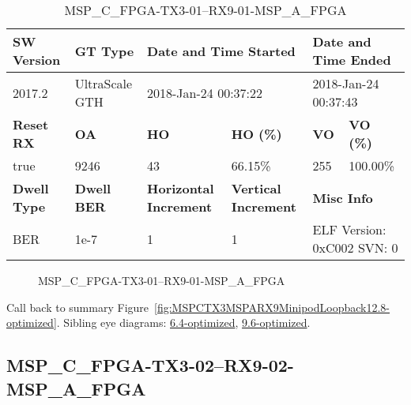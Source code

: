 \begin{table}[h]
\centering
\caption{MSP\_C\_FPGA-TX3-01--RX9-01-MSP\_A\_FPGA}
\label{tab:MSPCFPGATX301RX901MSPAFPGA12.8-optimized}
\begin{tabular}{@{}|l|l|l|l|l|l|@{}}
\toprule
\textbf{SW Version}                & \textbf{GT Type}   & \multicolumn{2}{l|}{\textbf{Date and Time Started}}            & \multicolumn{2}{l|}{\textbf{Date and Time Ended}}        \\ \midrule
2017.2                       & UltraScale GTH          & \multicolumn{2}{l|}{2018-Jan-24 00:37:22}                   & \multicolumn{2}{l|}{2018-Jan-24 00:37:43}               \\ \midrule
\textbf{Reset RX}                  & \textbf{OA} & \textbf{HO}   & \textbf{HO (\%)} & \textbf{VO} & \textbf{VO (\%)} \\ \midrule
true & 9246        & 43          & 66.15\%        & 255        & 100.00\%       \\ \midrule
\textbf{Dwell Type}                & \textbf{Dwell BER} & \textbf{Horizontal Increment} & \textbf{Vertical Increment}    & \multicolumn{2}{l|}{\textbf{Misc Info}}                  \\ \midrule
BER                            & 1e-7        & 1        & 1           & \multicolumn{2}{l|}{ELF Version: 0xC002 SVN: 0}                         \\ \bottomrule
\end{tabular}
\end{table}

\begin{figure}[h]
\caption{MSP\_C\_FPGA-TX3-01--RX9-01-MSP\_A\_FPGA} \label{fig:MSPCFPGATX301RX901MSPAFPGA12.8-optimized}
\end{figure}

Call back to summary Figure~\ref{fig:MSPCTX3MSPARX9MinipodLoopback12.8-optimized}.
Sibling eye diagrams: \hyperref[sec:MSPCFPGATX301RX901MSPAFPGA6.4-optimized]{6.4-optimized}, \hyperref[sec:MSPCFPGATX301RX901MSPAFPGA9.6-optimized]{9.6-optimized}.

\clearpage
\newpage


\subsection{MSP\_C\_FPGA-TX3-02--RX9-02-MSP\_A\_FPGA}\label{sec:MSPCFPGATX302RX902MSPAFPGA12.8-optimized}

